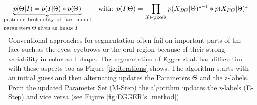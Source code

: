 \[ 
\underbrace{p(\Theta |I)=p(I| \Theta)*p(\Theta)}_{\mathclap{\text{\parbox{4.5cm}{posterior brobability of face model parameters $\Theta$ given an image $I$}}}}\quad\quad\text{ with: }p(I|\Theta)=\prod_{X \in \text{pixels}}p(X_{BG}|\Theta)^{z-1}*p(X_{FG}|\Theta)^z
\]
Conventional approaches for segmentation often fail on important parts of the face such as the eyes, eyebrows or the oral region because of their strong variability in color and shape. The segmentation of Egger et al. has difficulties with these aspects too as Figure \ref{fig:iterations} shows. The algorithm starts with an initial guess and then alternating updates the Parameters $\Theta$ and the z-labels. From the updated Parameter Set (M-Step) the algorithm updates the z-labels (E-Step) and vice versa (see Figure \ref{fig:EGGER's_method}).\\

